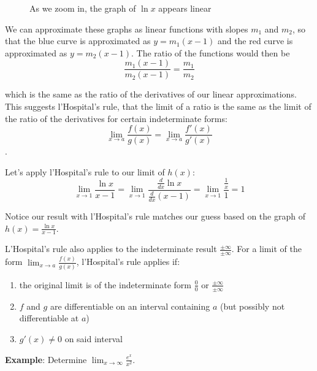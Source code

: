 \begin{figure}[htbp]
\centering
{}
\caption{As we zoom in, the graph of $\ln{x}$ appears linear}
\label{fig:zoom2}
\end{figure}

We can approximate these graphs as linear functions with slopes $m_1$ and 
$m_2$, so that the blue curve is approximated as $y=m_1(x-1)$ and the red 
curve is approximated as $y=m_2(x-1)$. The ratio of the functions would then 
be 
$$\frac{m_1(x-1)}{m_2(x-1)}=\frac{m_1}{m_2}$$ 

which is the same as the ratio of the derivatives of our linear approximations. 
This suggests l'Hospital's rule, that the limit of a ratio is the same as the 
limit of the ratio of the derivatives for certain indeterminate forms: 
$$\lim_{x\to a}\frac{f(x)}{g(x)}=\lim_{x\to a}\frac{f'(x)}{g'(x)}$$.

Let's apply l'Hospital's rule to our limit of $h(x)$:
$$\lim_{x\to 1} \frac{\ln{x}}{x - 1} = \lim_{x \to 1} \frac{\frac{d}{dx} 
\ln{x}}{\frac{d}{dx} (x - 1)} = \lim_{x \to 1} \frac{\frac{1}{x}}{1}=1$$

Notice our result with l'Hospital's rule matches our guess based on the graph 
of $h(x) = \frac{\ln{x}}{x-1}$. 

L'Hospital's rule also applies to the indeterminate result $\frac{\pm \infty}
{\pm \infty}$. For a limit of the form $\lim_{x\to a}\frac{f(x)}{g(x)}$, 
l'Hospital's rule applies if:
\begin{enumerate}
    \item the original limit is of the indeterminate form $\frac{0}{0}$ or 
    $\frac{\pm \infty}{\pm \infty}$
    \item $f$ and $g$ are differentiable on an interval containing $a$ (but 
    possibly not differentiable at $a$)
    \item $g'(x) \neq 0$ on said interval
\end{enumerate}

\textbf{Example}: Determine $\lim_{x \to \infty} \frac{e^x}{x^2}$.

